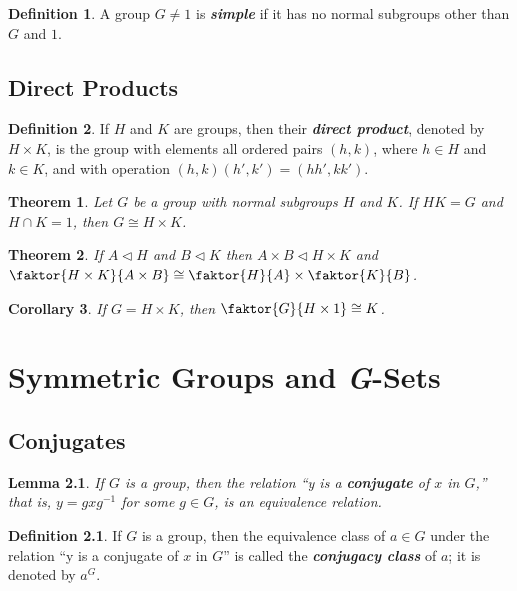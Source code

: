 \documentclass[12pt]{report}
\newtheorem{theorem}{Theorem}[chapter]
\newtheorem{corollary}[theorem]{Corollary}
\newtheorem{lemma}[theorem]{Lemma}
\theoremstyle{definition}
\newtheorem*{definition}{Definition}
\newcommand{\term}[1]{\textbf{\textit{#1}}}
\begin{document}
\begin{definition}
	A group $G\neq 1$ is \term{simple} if it has no normal subgroups other than $G$ and $1$.
\end{definition}



\section{Direct Products}

\begin{definition}
	If $H$ and $K$ are groups, then their \term{direct product}, denoted by $H\times K$, is the group with elements all
	ordered pairs $(h, k)$, where $h\in H$ and $k\in K$, and with operation $(h, k)(h', k')=(hh', kk')$.
\end{definition}

\begin{theorem}
	Let $G$ be a group with normal subgroups $H$ and $K$. If $HK=G$ and $H\cap K=1$, then $G\cong H\times K$.
\end{theorem}

\begin{theorem}
	If $A\vartriangleleft H$ and $B\vartriangleleft K$ then $A\times B\vartriangleleft H\times K$ and
	$\faktor{H\times K}{A\times B}\cong\faktor{H}{A}\times\faktor{K}{B}$.
\end{theorem}

\begin{corollary}
	If $G=H\times K$, then $\faktor{G}{H\times 1}\cong K$.
\end{corollary}


\chapter{Symmetric Groups and \textit{G}-Sets}

\section{Conjugates}
\begin{lemma}
	If $G$ is a group, then the relation “y is a \term{conjugate} of $x$ in $G$,” that is, $y=gxg^{-1}$ for some $g\in G$, is an equivalence relation.
\end{lemma}

\begin{definition}
	If $G$ is a group, then the equivalence class of $a\in G$ under the relation “y is a conjugate of $x$ in $G$” is called the \term{conjugacy class} of $a$; it is denoted by $a^G$.
\end{definition}
\end{document}
